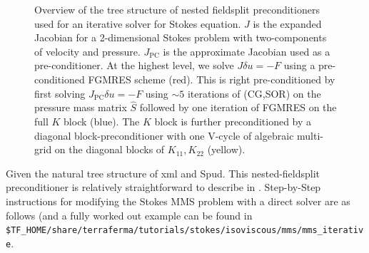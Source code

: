 \begin{figure}[h!]
  \caption{\label{fig:fieldsplit_stokes} Overview of the tree
    structure of nested fieldsplit preconditioners used  for an
    iterative solver for Stokes equation.  $J$ is the expanded
    Jacobian for a 2-dimensional Stokes problem with two-components of
  velocity and pressure.  $J_{\text{PC}}$ is the approximate Jacobian
  used as a pre-conditioner.  At the highest level, we solve $J\delta
  u=-F$ using a pre-conditioned FGMRES scheme (red).  This is
  right pre-conditioned by first solving $J_{\text{PC}}\delta u = -F$
  using $\sim5$ iterations  of (CG,SOR) on the pressure mass matrix
  $\hat{S}$ followed by one iteration of FGMRES on the full $K$ block
  (blue).  The $K$ block is further  preconditioned by a diagonal
  block-preconditioner with one V-cycle of   algebraic multi-grid on
  the diagonal blocks of $K_{11}, K_{22}$ (yellow).}
 \end{figure}

Given the natural tree structure of xml and Spud.  This
nested-fieldsplit preconditioner is relatively straightforward to
describe in \TF{}.  Step-by-Step instructions for modifying the Stokes
MMS problem with a direct solver are as follows (and a fully worked
out example can be found in
\texttt{\$TF\_HOME/share/terraferma/tutorials/stokes/isoviscous/mms/mms\_iterative}.

